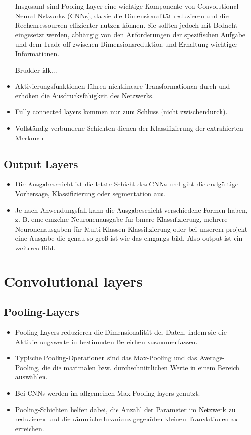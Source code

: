 \begin{itemize}
Insgesamt sind Pooling-Layer eine wichtige Komponente von Convolutional Neural Networks (CNNs), da sie die Dimensionalität reduzieren und die Rechenressourcen effizienter nutzen können. Sie sollten jedoch mit Bedacht eingesetzt werden, abhängig von den Anforderungen der spezifischen Aufgabe und dem Trade-off zwischen Dimensionsreduktion und Erhaltung wichtiger Informationen.

Brudder idk...


  
  \item Aktivierungsfunktionen führen nichtlineare Transformationen durch und erhöhen die Ausdrucksfähigkeit des Netzwerks.
  \item Fully connected layers kommen nur zum Schluss (nicht zwischendurch).
  \item Vollständig verbundene Schichten dienen der Klassifizierung der extrahierten Merkmale.
\end{itemize}

\subsection{Output Layers}
\begin{itemize}
  \item Die Ausgabeschicht ist die letzte Schicht des CNNs und gibt die endgültige Vorhersage, Klassifizierung oder segmentation aus.
  \item Je nach Anwendungsfall kann die Ausgabeschicht verschiedene Formen haben, z. B. eine einzelne Neuronenausgabe für binäre Klassifizierung, mehrere Neuronenausgaben für Multi-Klassen-Klassifizierung oder bei unserem projekt eine Ausgabe die genau so groß ist wie das eingangs bild. Also output ist ein weiteres Bild.
\end{itemize}

\section{Convolutional layers}

\subsection{Pooling-Layers}
\begin{itemize}
  \item Pooling-Layers reduzieren die Dimensionalität der Daten, indem sie die Aktivierungswerte in bestimmten Bereichen zusammenfassen.
  \item Typische Pooling-Operationen sind das Max-Pooling und das Average-Pooling, die die maximalen bzw. durchschnittlichen Werte in einem Bereich auswählen.
  \item Bei CNNs werden im allgemeinen Max-Pooling layers genutzt.
  \item Pooling-Schichten helfen dabei, die Anzahl der Parameter im Netzwerk zu reduzieren und die räumliche Invarianz gegenüber kleinen Translationen zu erreichen.
\end{itemize}

